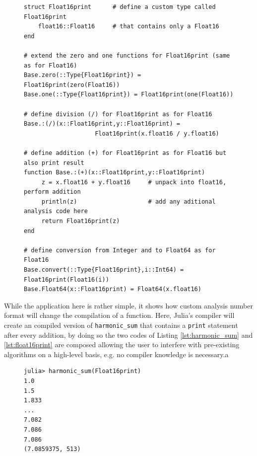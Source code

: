 \begin{figure}[tbhp]
\begin{lstlisting}[language=JuliaLocal, label=lst:float16print, caption={\textbf{Minimal example of the definition of a new custom analysis
number format \texttt{Float16print} in Julia.} The number format behaves like Float16 and defines all operations needed for \texttt{harmonic\_sum}
but the addition is extended with a \texttt{print} statement that helps to analyse code without changing \texttt{harmonic\_sum} itself.}]
struct Float16print      # define a custom type called Float16print
    float16::Float16     # that contains only a Float16
end

# extend the zero and one functions for Float16print (same as for Float16)
Base.zero(::Type{Float16print}) = Float16print(zero(Float16))
Base.one(::Type{Float16print}) = Float16print(one(Float16))

# define division (/) for Float16print as for Float16
Base.:(/)(x::Float16print,y::Float16print) =
					Float16print(x.float16 / y.float16)

# define addition (+) for Float16print as for Float16 but also print result
function Base.:(+)(x::Float16print,y::Float16print)
     z = x.float16 + y.float16     # unpack into float16, perform addition
     println(z)                    # add any aditional analysis code here
     return Float16print(z)
end

# define conversion from Integer and to Float64 as for Float16
Base.convert(::Type{Float16print},i::Int64) = Float16print(Float16(i))
Base.Float64(x::Float16print) = Float64(x.float16)
\end{lstlisting}
\end{figure}

While the application here is rather simple, it shows how custom analysis number format will change the compilation of a function. Here,
Julia's compiler will create an compiled version of \texttt{harmonic\_sum} that contains a \texttt{print} statement after
every addition, by doing so the two codes of Listing \ref{lst:harmonic_sum} and \ref{lst:float16print} are composed allowing the user
to interfere with pre-existing algorithms on a high-level basis, e.g. no compiler knowledge is necessary.a

\begin{figure}[tbhp]
\begin{lstlisting}[language=JuliaLocal, label=lst:harmonic_sum_float16print, caption={\textbf{Analysing the function \texttt{harmonic\_sum} with the
new custom number format \texttt{Float16print}.} Executing \texttt{harmonic\_sum} with \texttt{Float16print} triggers a \texttt{print} statement
on every addition, i.e. after every term of the harmonic sum, but any other additional code can be executed too. Analysis number formats can
be used to investigate even complicated algorithms without explicitly changing them.}]
julia> harmonic_sum(Float16print)
1.0
1.5
1.833
...
7.082
7.086
7.086
(7.0859375, 513)
\end{lstlisting}
\end{figure}

